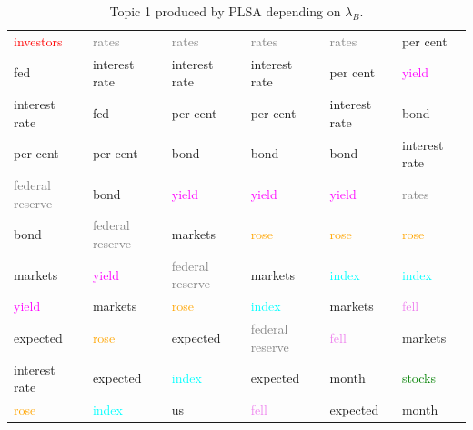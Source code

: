 \documentclass[11pt,a4paper,english,oneside]{book}
\numberwithin{equation}{chapter}
\begin{document}
\begin{table}
\begin{tabular}{ p{3cm}  p{3cm}  p{3cm}  p{3cm}  p{3cm}  p{3cm}}
		 \textcolor{red}{investors}		& \textcolor{gray}{rates}			& \textcolor{gray}{rates}		& \textcolor{gray}{rates}			&\textcolor{gray}{rates}		& per cent\\
		 fed  							& interest rate 					& interest rate					& interest rate						&per cent						& \textcolor{magenta}{yield} \\
		 interest  rate					& fed 								& per cent						& per cent							&interest rate					& bond \\
		 per cent 						& per cent 							& bond 							& bond 								&bond 							& interest rate\\
		 \textcolor{gray}{federal reserve }& bond 							& \textcolor{magenta}{yield}	& \textcolor{magenta}{yield}		&\textcolor{magenta}{yield}		& \textcolor{gray}{rates} \\
		 bond  							& \textcolor{gray}{federal reserve }& markets 						& \textcolor{orange}{rose }			&\textcolor{orange}{rose }		& \textcolor{orange}{rose }	 \\
		 markets  						& \textcolor{magenta}{yield}		& \textcolor{gray}{federal reserve }& markets 							&\textcolor{cyan}{index }		& \textcolor{cyan}{index } \\
		 \textcolor{magenta}{yield}		& markets 							& \textcolor{orange}{rose }		& \textcolor{cyan}{index }			&markets 						& \textcolor{violet}{fell } \\
		 expected  						& \textcolor{orange}{rose }			& expected 						& \textcolor{gray}{federal reserve }&\textcolor{violet}{fell }		& markets \\
		 interest rate 					& expected							& \textcolor{cyan}{index }		& expected 							&month 							& \textcolor{green}{stocks} \\
		 \textcolor{orange}{rose}  		& \textcolor{cyan}{index }			& us 							& \textcolor{violet}{fell }			&expected 						& month \\		  
		\bottomrule %
	\end{tabular}
	\caption{Topic 1 produced by PLSA depending on $\lambda_B$.} %
	\label{tab:topics} %
\end{table}
\end{document}
